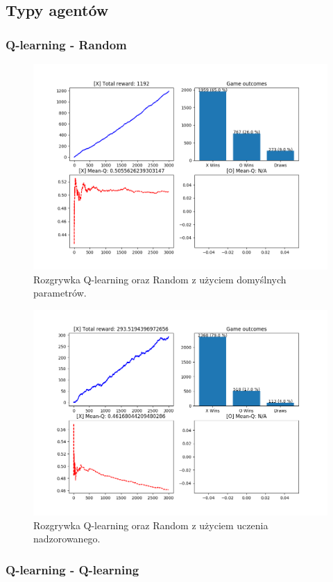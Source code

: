 \subsection{Typy agentów}

\subsubsection{Q-learning - Random}

\begin{figure}[H]
	\centering
	\includegraphics[width=0.7\linewidth]{imgs/q_learning/vs/q-r}
	\caption{Rozgrywka Q-learning oraz Random z użyciem domyślnych parametrów.}
\end{figure}

\begin{figure}[H]
	\centering
	\includegraphics[width=0.7\linewidth]{imgs/q_learning/vs/q-r-supervised}
	\caption{Rozgrywka Q-learning oraz Random z użyciem uczenia nadzorowanego.}
\end{figure}

\subsubsection{Q-learning - Q-learning}

